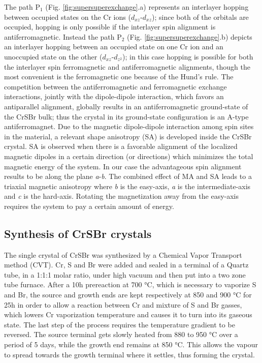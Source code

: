 \documentclass[journal]{IEEEtran}
\begin{document}
The path P$_1$ (Fig. \ref{fig:supersuperexchange}.a) represents an interlayer hopping between occupied states on the Cr ions ($d_{xz}$-$d_{xz}$); since both of the orbitals are occupied, hopping is only possible if the interlayer spin alignment is antiferromagnetic. Instead the path P$_2$ (Fig. \ref{fig:supersuperexchange}.b) depicts an interlayer hopping between an occupied state on one Cr ion and an unoccupied state on the other ($d_{xz}$-$d_{z^2}$); in this case hopping is possible for both the interlayer spin ferromagnetic and antiferromagnetic alignments, though the most convenient is the ferromagnetic one because of the Hund's rule. The competition between the antiferromagnetic and ferromagnetic exchange interactions, jointly with the dipole-dipole interaction, which favors an antiparallel alignment, globally results in an antiferromagnetic ground-state of the CrSBr bulk; thus the crystal in its ground-state configuration is an A-type antiferromagnet.
Due to the magnetic dipole-dipole interaction among spin sites in the material, a relevant shape anisotropy (SA) is developed inside the CrSBr crystal. SA is observed when there is a favorable alignment of the localized magnetic dipoles in a certain direction (or directions) which minimizes the total magnetic energy of the system. In our case the advantageous spin alignment results to be along the plane \textit{a}-\textit{b}.
The combined effect of MA and SA leads to a triaxial magnetic anisotropy where \textit{b} is the easy-axis, \textit{a} is the intermediate-axis and \textit{c} is the hard-axis. Rotating the magnetization away from the easy-axis requires the system to pay a certain amount of energy.

\subsection{Synthesis of CrSBr crystals}

The single crystal of CrSBr was synthesized by a Chemical Vapor Transport method (CVT). Cr, S and Br were added and sealed in a terminal of a Quartz tube, in a 1:1:1 molar ratio, under high vacuum and then put into a two zone tube furnace. After a 10h prereaction at 700 °C, which is necessary to vaporize S and Br, the source and growth ends are kept respectively at 850 and 900 °C for 25h in order to allow a reaction between Cr and mixture of S and Br gasses, which lowers Cr vaporization temperature and causes it to turn into its gaseous state.
The last step of the process requires the temperature gradient to be reversed. The source terminal gets slowly heated from 880 to 950 °C over a period of 5 days, while the growth end remains at 850 °C. This allows the vapour to spread towards the growth terminal where it settles, thus forming the crystal.
\end{document}
